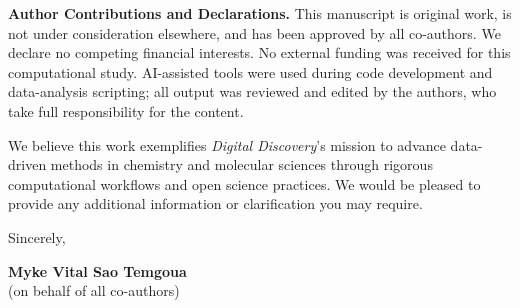 \documentclass[11pt,letterpaper]{article}
\begin{document}
\vspace{0.3em}

\noindent\textbf{Author Contributions and Declarations.}
This manuscript is original work, is not under consideration elsewhere, and has been approved by all co-authors. We declare no competing financial interests. No external funding was received for this computational study. AI-assisted tools were used during code development and data-analysis scripting; all output was reviewed and edited by the authors, who take full responsibility for the content.

We believe this work exemplifies \textit{Digital Discovery}'s mission to advance data-driven methods in chemistry and molecular sciences through rigorous computational workflows and open science practices. We would be pleased to provide any additional information or clarification you may require.

\vspace{0.5em}

\noindent Sincerely,

\vspace{0.5em}

\noindent \textbf{Myke Vital Sao Temgoua} \\
\noindent (on behalf of all co-authors)
\end{document}

